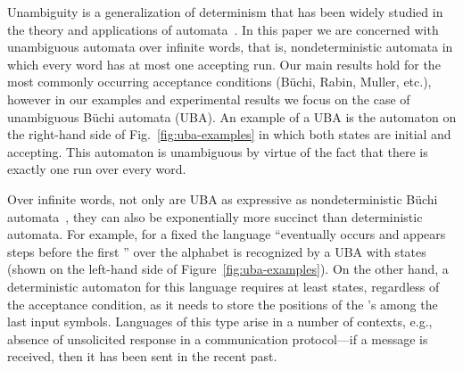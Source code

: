 \documentclass{elsarticle}
\begin{document}
Unambiguity is a generalization of determinism that has been widely
studied in the theory and applications of
automata~\cite{Colcombet12,Colcombet15}.  In this paper we are
concerned with unambiguous automata over infinite words, that is,
nondeterministic automata in which every word has at most one
accepting run.  Our main results hold for the most commonly occurring
acceptance conditions (B\"{u}chi, Rabin, Muller, etc.), however in our
examples and experimental results we focus on the case of unambiguous
B\"{u}chi automata (UBA).  An example of a UBA is the automaton on the
right-hand side of Fig.~\ref{fig:uba-examples} in which both states
are initial and accepting.  This automaton is unambiguous by virtue of
the fact that there is exactly one run over every word.


Over infinite words, not only are UBA as expressive as
nondeterministic B\"uchi automata~\cite{Arnold85}, they can also be
exponentially more succinct than deterministic automata.  For example,
for a fixed 
the language ``eventually  occurs and  appears  steps before
the first '' over the alphabet  is recognized by a UBA
with  states (shown on the left-hand side of
Figure~\ref{fig:uba-examples}).  On the other hand, a deterministic
automaton for this language requires at least  states, regardless
of the acceptance condition, as it needs to store the positions of the
's among the last  input symbols.  Languages of this type arise
in a number of contexts, e.g., absence of unsolicited response in a
communication protocol---if a message is received, then it has been
sent in the recent past.
\end{document}
